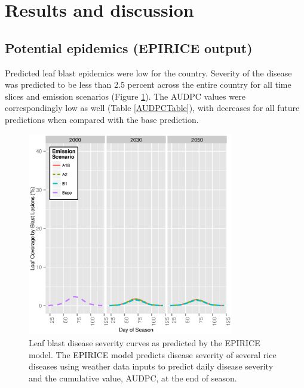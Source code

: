 \documentclass[preprint,12pt]{elsarticle}
\begin{document}
\section{Results and discussion}

\subsection{Potential epidemics (EPIRICE output)}
Predicted leaf blast epidemics were low for the country. Severity of the disease was predicted to be less than 2.5 percent across the entire country for all time slices and emission scenarios (Figure \ref{LBCurves}). The AUDPC values were correspondingly low as well (Table \ref{AUDPCTable}), with decreases for all future predictions when compared with the base prediction.

\begin{figure}[H]
  \includegraphics[width = 90mm]{figures/LB}
  \caption{Leaf blast disease severity curves as predicted by the EPIRICE model. The EPIRICE model predicts disease severity of several rice diseases using weather data inputs to predict daily disease severity and the cumulative value, AUDPC, at the end of season.}
    \label{LBCurves}
\end{figure}
\end{document}
